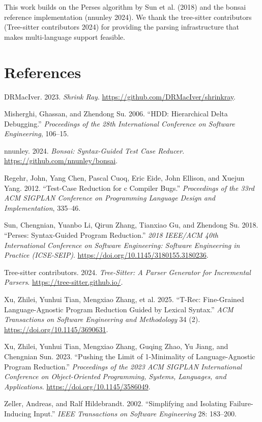 \documentclass[
  letterpaper,
]{article}
\newlength{\cslhangindent}
\newenvironment{CSLReferences}[2] %
 {\begin{list}{}{%
  \setlength{\itemindent}{0pt}
  \setlength{\leftmargin}{0pt}
  \setlength{\parsep}{0pt}
  \ifodd #1
   \setlength{\leftmargin}{\cslhangindent}
   \setlength{\itemindent}{-1\cslhangindent}
  \fi
  \setlength{\itemsep}{#2\baselineskip}}}
 {\end{list}}
\begin{document}
This work builds on the Perses algorithm by Sun et al. (2018) and the
bonsai reference implementation ({nnunley} 2024). We thank the
tree-sitter contributors (Tree-sitter contributors 2024) for providing
the parsing infrastructure that makes multi-language support feasible.

\section*{References}\label{references}

\protect{}\label{refs}
\begin{CSLReferences}{1}{1}
DRMacIver. 2023. \emph{Shrink Ray}.
\url{https://github.com/DRMacIver/shrinkray}.

Misherghi, Ghassan, and Zhendong Su. 2006. {``HDD: Hierarchical Delta
Debugging.''} \emph{Proceedings of the 28th International Conference on
Software Engineering}, 106--15.

{nnunley}. 2024. \emph{Bonsai: Syntax-Guided Test Case Reducer}.
\url{https://github.com/nnunley/bonsai}.

Regehr, John, Yang Chen, Pascal Cuoq, Eric Eide, John Ellison, and
Xuejun Yang. 2012. {``Test-Case Reduction for c Compiler Bugs.''}
\emph{Proceedings of the 33rd ACM SIGPLAN Conference on Programming
Language Design and Implementation}, 335--46.

Sun, Chengnian, Yuanbo Li, Qirun Zhang, Tianxiao Gu, and Zhendong Su.
2018. {``Perses: Syntax-Guided Program Reduction.''} \emph{2018 IEEE/ACM
40th International Conference on Software Engineering: Software
Engineering in Practice (ICSE-SEIP)}.
\url{https://doi.org/10.1145/3180155.3180236}.

Tree-sitter contributors. 2024. \emph{Tree-Sitter: A Parser Generator
for Incremental Parsers}. \url{https://tree-sitter.github.io/}.

Xu, Zhilei, Yunhui Tian, Mengxiao Zhang, et al. 2025. {``T-Rec:
Fine-Grained Language-Agnostic Program Reduction Guided by Lexical
Syntax.''} \emph{ACM Transactions on Software Engineering and
Methodology} 34 (2). \url{https://doi.org/10.1145/3690631}.

Xu, Zhilei, Yunhui Tian, Mengxiao Zhang, Guqing Zhao, Yu Jiang, and
Chengnian Sun. 2023. {``Pushing the Limit of 1-Minimality of
Language-Agnostic Program Reduction.''} \emph{Proceedings of the 2023
ACM SIGPLAN International Conference on Object-Oriented Programming,
Systems, Languages, and Applications}.
\url{https://doi.org/10.1145/3586049}.

Zeller, Andreas, and Ralf Hildebrandt. 2002. {``Simplifying and
Isolating Failure-Inducing Input.''} \emph{IEEE Transactions on Software
Engineering} 28: 183--200.

\end{CSLReferences}
\end{document}
